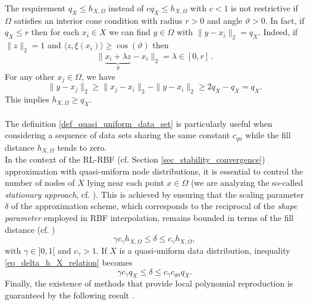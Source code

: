 \documentclass{drna}
\begin{document}
\noindent The requirement $q_{X} \leq h_{X,\Omega}$ instead of $c q_{X} \leq h_{X,\Omega}$ with $c < 1$ is not restrictive if $\Omega$ satisfies an interior cone condition with radius $r>0$ and angle $\vartheta>0$. In fact, if $q_{X} \leq r$ then for each $x_i \in X$ we can find $y \in \Omega$ with $\|y-x_i\|_2 = q_{X}$. Indeed, if $\|z\|_2=1$ and $\langle z, \xi(x_i) \rangle \geq \cos(\vartheta)$ then
\begin{equation*}
    \|\underbrace{x_i+\lambda z}_{y} -x_i\|_2 = \lambda \in [0,r]\,.
\end{equation*}
For any other $x_j \in \Omega$, we have
\begin{equation*}
\|y-x_j\|_2 \geq \|x_j-x_i\|_2-\|y-x_i\|_2 \geq 2q_{X}-q_{X}=q_{X}.
\end{equation*}
This implies $h_{X,\Omega} \geq q_{X}$.
\\ \\
The definition \ref{def_quasi_uniform_data_set} is particularly useful when considering a sequence of data sets sharing the same constant $c_{qu}$ while the fill distance $h_{X,\Omega}$ tends to zero.
\\
In the context of the RL-RBF (cf. Section \ref{sec_stability_convergence}) approximation with quasi-uniform node distributions, it is essential to control the number of nodes of $X$ lying near each point $x \in \Omega$ (we are analyzing the so-called \textit{stationary approach}, cf. \cite[Theorem 11.17]{wendland_2004}). This is achieved by ensuring that the scaling parameter $\delta$ of the approximation scheme, which corresponds to the reciprocal of the \textit{shape parameter} employed in RBF interpolation, remains bounded in terms of the fill distance (cf. \cite{demarchi2020})
 \begin{equation} 
    \gamma c_{\gamma} h_{X,\Omega} \leq \delta \leq c_{\gamma} h_{X,\Omega},
    \label{eq_delta_h_X_relation}
\end{equation}
with $\gamma \in ]0,1[$ and $c_{\gamma}>1$. 
If $X$ is a quasi-uniform data distribution, inequality \eqref{eq_delta_h_X_relation} becomes
\begin{equation}
    \gamma c_{\gamma} q_{X} \leq \delta \leq c_\gamma c_{qu} q_X.
    \label{eq_delta_q_X_relation}
\end{equation}
Finally, the existence of methods that provide local polynomial reproduction is guaranteed by the following result \cite[Theorem 3.14]{wendland_2004}.
\end{document}
